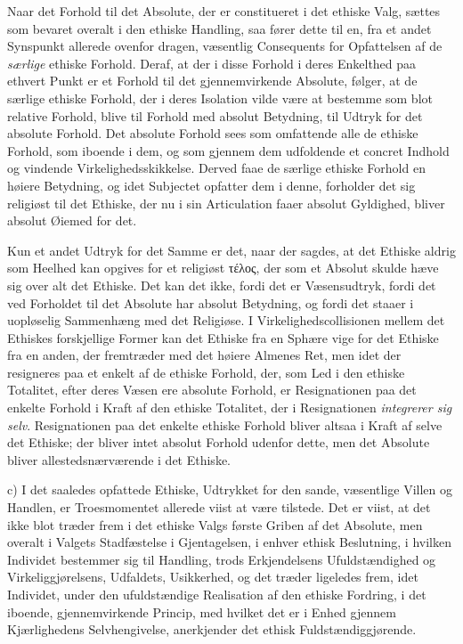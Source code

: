 Naar det Forhold til det Absolute, der er constitueret i det ethiske Valg, sættes
som bevaret overalt i den ethiske Handling, saa fører dette til en, fra et andet
Synspunkt allerede ovenfor dragen, væsentlig Consequents for Opfattelsen af de
\emph{særlige} ethiske Forhold. Deraf, at der i disse Forhold i deres Enkelthed
paa ethvert Punkt er et Forhold til det gjennemvirkende Absolute, følger, at de
særlige ethiske Forhold, der i deres Isolation vilde være at bestemme som blot
relative Forhold, blive til Forhold med absolut Betydning, til Udtryk for det
absolute Forhold. Det absolute Forhold sees som omfattende alle de ethiske
Forhold, som iboende i dem, og som gjennem dem udfoldende et concret Indhold og
vindende Virkelighedsskikkelse. Derved faae de særlige ethiske Forhold en høiere
Betydning, og idet Subjectet opfatter dem i denne, forholder det sig religiøst til
det Ethiske, der nu i sin Articulation faaer absolut Gyldighed, bliver absolut
Øiemed for det.

Kun et andet Udtryk for det Samme er det, naar der sagdes, at det Ethiske aldrig
som Heelhed kan opgives for et religiøst τέλος, der som et Absolut skulde hæve sig
over alt det Ethiske. Det kan det ikke, fordi det er Væsensudtryk, fordi det ved
Forholdet til det Absolute har absolut
 Betydning, og fordi det staaer i uopløselig Sammenhæng med det Religiøse. I
Virkelighedscollisionen mellem det Ethiskes forskjellige Former kan det Ethiske
fra en Sphære vige for det Ethiske fra en anden, der fremtræder med det høiere
Almenes Ret, men idet der resigneres paa et enkelt af de ethiske Forhold, der, som
Led i den ethiske Totalitet, efter deres Væsen ere absolute Forhold, er
Resignationen paa det enkelte Forhold i Kraft af den ethiske Totalitet, der i
Resignationen \emph{integrerer sig selv}. Resignationen paa det enkelte ethiske
Forhold bliver altsaa i Kraft af selve det Ethiske; der bliver intet absolut
Forhold udenfor dette, men det Absolute bliver allestedsnærværende i det Ethiske.

c) I det saaledes opfattede Ethiske, Udtrykket for den sande, væsentlige Villen og
Handlen, er Troesmomentet allerede viist at være tilstede. Det er viist, at det
ikke blot træder frem i det ethiske Valgs første Griben af det Absolute, men
overalt i Valgets Stadfæstelse i Gjentagelsen, i enhver ethisk Beslutning, i
hvilken Individet bestemmer sig til Handling, trods Erkjendelsens
Ufuldstændighed og Virkeliggjørelsens, Udfaldets, Usikkerhed, og det træder
ligeledes frem, idet Individet, under den ufuldstændige Realisation af den ethiske
Fordring, i det iboende, gjennemvirkende Princip, med hvilket det er i Enhed
gjennem Kjærlighedens Selvhengivelse, anerkjender det ethisk Fuldstændiggjørende.

